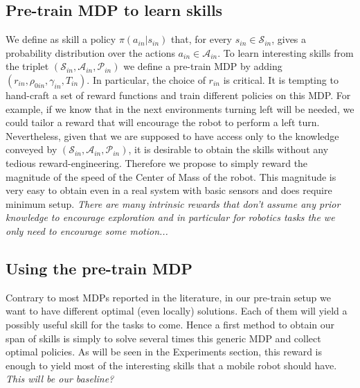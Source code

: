 \documentclass{article} %
\begin{document}
\subsection{Pre-train MDP to learn skills}

We define as skill a policy $\pi(a_{in} | s_{in})$ that, for every $s_{in}\in\mathcal{S}_{in}$, gives a probability distribution over the actions $a_{in}\in\mathcal{A}_{in}$. To learn interesting skills from the triplet $(\mathcal{S}_{in}, \mathcal{A}_{in}, \mathcal{P}_{in})$ we define a pre-train MDP by adding $(r_{in}, \rho_{0in}, \gamma_{in}, T_{in})$. In particular, the choice of $r_{in}$ is critical. It is tempting to hand-craft a set of reward functions and train different policies on this MDP. For example, if we know that in the next environments turning left will be needed, we could tailor a reward that will encourage the robot to perform a left turn. Nevertheless, given that we are supposed to have access only to the knowledge conveyed by $(\mathcal{S}_{in}, \mathcal{A}_{in}, \mathcal{P}_{in})$, it is desirable to obtain the skills without any tedious reward-engineering. Therefore we propose to simply reward the magnitude of the speed of the Center of Mass of the robot. This magnitude is very easy to obtain even in a real system with basic sensors and does require minimum setup. 
\textit{There are many intrinsic rewards that don't assume any prior knowledge to encourage exploration and in particular for robotics tasks the we only need to encourage some motion...}

\subsection{Using the pre-train MDP}
Contrary to most MDPs reported in the literature, in our pre-train setup we want to have different optimal (even locally) solutions. Each of them will yield a possibly useful skill for the tasks to come. Hence a first method to obtain our span of skills is simply to solve several times this generic MDP and collect optimal policies. As will be seen in the Experiments section, this reward is enough to yield most of the interesting skills that a mobile robot should have. \textit{This will be our baseline?}
\end{document}
